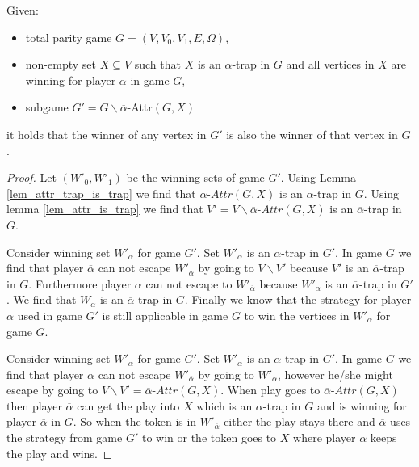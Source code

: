 \begin{lemma}
\label{lem_GwithoutB_is_subset}
	Given:
	\begin{itemize}
		\item total parity game $G = (V,V_0,V_1,E,\Omega)$,
		\item non-empty set $X \subseteq V$ such that $X$ is an $\alpha$-trap in $G$ and all vertices in $X$ are winning for player $\overline{\alpha}$ in game $G$,
		\item subgame $G' = G\backslash \overline{\alpha}$-Attr$(G,X)$
	\end{itemize}
	it holds that the winner of any vertex in $G'$ is also the winner of that vertex in $G$.
	\begin{proof}
		Let $(W'_0, W'_1)$ be the winning sets of game $G'$. Using Lemma \ref{lem_attr_trap_is_trap} we find that $\overline{\alpha}\textit{-Attr}(G,X)$ is an $\alpha$-trap in $G$. Using lemma \ref{lem_attr_is_trap} we find that $V' = V\backslash \overline{\alpha}\textit{-Attr}(G,X)$ is an $\overline{\alpha}$-trap in $G$.
		
		Consider winning set $W'_\alpha$ for game $G'$. Set $W'_\alpha$ is an $\overline{\alpha}$-trap in $G'$. In game $G$ we find that player $\overline{\alpha}$ can not escape $W'_\alpha$ by going to $V\backslash  V'$ because $V'$ is an $\overline{\alpha}$-trap in $G$. Furthermore player $\alpha$ can not escape to $W'_{\overline{\alpha}}$ because $W'_\alpha$ is an $\overline{\alpha}$-trap in $G'$. We find that $W_\alpha$ is an $\overline{\alpha}$-trap in $G$. Finally we know that the strategy for player $\alpha$ used in game $G'$ is still applicable in game $G$ to win the vertices in $W'_\alpha$ for game $G$.
		
		Consider winning set $W'_{\overline{\alpha}}$ for game $G'$. Set $W'_{\overline{\alpha}}$ is an $\alpha$-trap in $G'$. In game $G$ we find that player $\alpha$ can not escape $W'_{\overline{\alpha}}$ by going to $W'_\alpha$, however he/she might escape by going to $V\backslash V' = \overline{\alpha}\textit{-Attr}(G,X)$. When play goes to $\overline{\alpha}\textit{-Attr}(G,X)$ then player $\overline{\alpha}$ can get the play into $X$ which is an $\alpha$-trap in $G$ and is winning for player $\overline{\alpha}$ in $G$. So when the token is in $W'_{\overline{\alpha}}$ either the play stays there and $\overline{\alpha}$ uses the strategy from game $G'$ to win or the token goes to $X$ where player $\overline{\alpha}$ keeps the play and wins.
	\end{proof}
\end{lemma}
